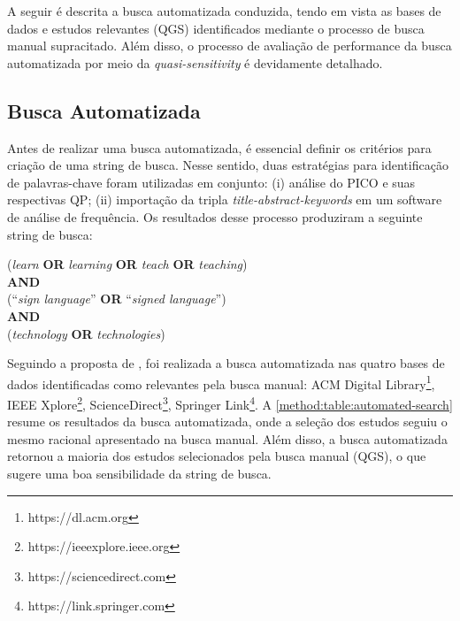 A seguir é descrita a busca automatizada conduzida, tendo em vista as bases de dados e estudos relevantes (QGS) identificados mediante o processo de busca manual supracitado. Além disso, o processo de avaliação de performance da busca automatizada por meio da \textit{quasi-sensitivity} é devidamente detalhado.

\subsection{Busca Automatizada}
\label{ms:conducao-busca-automatizada}

Antes de realizar uma busca automatizada, é essencial definir os critérios para criação de uma string de busca. Nesse sentido, duas estratégias para identificação de palavras-chave foram utilizadas em conjunto: (i) análise do PICO e suas respectivas QP; (ii) importação da tripla \textit{title-abstract-keywords} em um software de análise de frequência. Os resultados desse processo produziram a seguinte string de busca:

\begin{center}
    (\textit{learn} \textbf{OR} \textit{learning} \textbf{OR} \textit{teach} \textbf{OR} \textit{teaching})\\ 
    \textbf{AND}\\
    (``\textit{sign language}'' \textbf{OR} ``\textit{signed language}'')\\ 
    \textbf{AND}\\
    (\textit{technology} \textbf{OR} \textit{technologies})\\
\end{center}

Seguindo a proposta de , foi realizada a busca automatizada nas quatro bases de dados identificadas como relevantes pela busca manual: ACM Digital Library\footnote{https://dl.acm.org}, IEEE Xplore\footnote{https://ieeexplore.ieee.org}, ScienceDirect\footnote{https://sciencedirect.com}, Springer Link\footnote{https://link.springer.com}. %
A \autoref{method:table:automated-search} resume os resultados da busca automatizada, onde a seleção dos estudos seguiu o mesmo racional apresentado na busca manual. Além disso, a busca automatizada retornou a maioria dos estudos selecionados pela busca manual (QGS), o que sugere uma boa sensibilidade da string de busca. %

